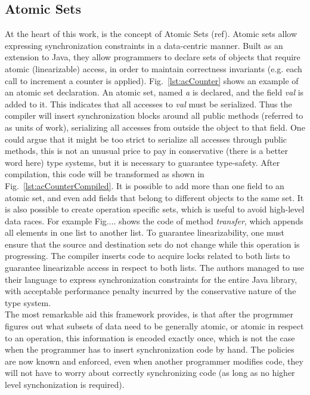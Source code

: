 \subsection{Atomic Sets}
At the heart of this work, is the concept of Atomic Sets (ref). Atomic sets allow 
expressing synchronization constraints in a
data-centric manner. Built as an extension to Java, they allow programmers to
declare sets of objects that require atomic (linearizable) access, in order to
maintain correctness invariants (e.g. each call to increment a counter is
applied). Fig.~\ref{lst:acCounter} shows an example of an atomic set
declaration. An atomic set, named \emph{a} is declared, and the field \emph{val}
is added to it. This indicates that all accesses to \emph{val} must be
serialized. Thus the compiler will insert synchronization blocks around all
public methods (referred to as units of work), serializing all accesses from
outside the object to that field. One could argue that it might be too strict to
serialize all accesses through public methods, this is not an unusual price to
pay in conservative (there is a better word here) type systems, but it is
necessary to guarantee type-safety. After compilation, this code will be
transformed as shown in Fig.~\ref{lst:acCounterCompiled}. It is possible to add
more than one field to an atomic set, and even add fields that belong to different
objects to the same set. It is also possible to create operation specific sets,
which is useful to avoid high-level data races. For example Fig.... shows the
code of method \emph{transfer}, which appends all elements in one list to
another list. To guarantee linearizability, one must ensure that the source and destination
sets do not change while this operation is progressing. The compiler inserts
code to acquire locks related to both lists to guarantee linearizable access in
respect to both lists. The authors managed to use their language to express
synchronization constraints for the entire Java library, with acceptable
performance penalty incurred by the conservative nature of the type system. \\
The most remarkable aid this framework provides, is that after the progrmmer
figures out what subsets of data need to be generally atomic, or atomic in
respect to an operation, this information is encoded
exactly once, which is not the case when the programmer has to insert
synchronization code by hand. The policies are now known and enforced, even when
another programmer modifies code, they will not have to worry about correctly
synchronizing code (as long as no higher level synchonization is required). \\

